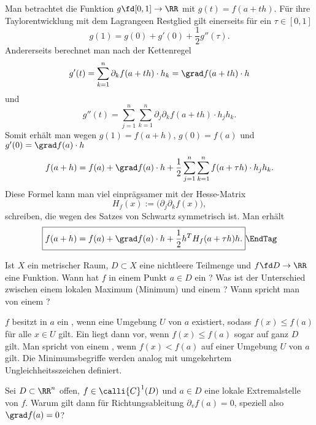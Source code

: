 \begin{antwort}
  Man betrachtet die Funktion $g\fd [0,1] \to\RR$ mit 
  $g(t)=f(a+th)$. Für ihre Taylorentwicklung mit dem Lagrange\sch en 
  Restglied gilt einerseits für ein $\tau \in [0,1]$ 
  \[
  g(1)=g(0)+g'(0)+\frac{1}{2} g''(\tau).
  \]
  Andererseits berechnet man nach der Kettenregel
  \[
  g'(t) = \sum_{k=1}^n \partial_k f(a+th) \cdot h_k = 
  \grad f(a+th)\cdot h 
  \]
  und 
  \[
  g''(t) = \sum_{j=1}^n\sum_{k=1}^n \partial_j \partial_k f(a+th)
  \cdot h_j h_k.  
  \]
  Somit erhält man wegen $g(1)=f(a+h)$, $g(0)=f(a)$ und 
  $g'(0)=\grad f(a)\cdot h$
  \[
  f(a+h)=f(a)+\grad f(a) \cdot h + \frac{1}{2} 
  \sum_{j=1}^n \sum_{k=1}^n f(a+\tau h)\cdot h_j h_k.
  \]
  Diese Formel kann man viel einprägsamer mit der  
  Hesse-Matrix 
  \[
  H_f (x ) := \big( \partial_j \partial_k f(x) \big),
  \]
  schreiben, die wegen des Satzes von Schwartz symmetrisch ist. Man erhält
  \begin{equation}
    \boxed{
      f(a+h)=f(a)+\grad f(a)\cdot h + \frac{1}{2} h^T H_f(a+\tau h) h.
    }
    \EndTag
  \end{equation}
\end{antwort}

\begin{frage}
  Ist $X$ ein metrischer Raum, $D\subset X$ eine nichtleere Teilmenge und 
  $f\fd D\to\RR$ eine Funktion. Wann hat $f$ in einem Punkt $a\in D$ ein 
  ? 
  Was ist der Unterschied zwischen einem lokalen Maximum (Mini\-mum) und 
  einem ?
  Wann spricht man von einem ?
\end{frage}

\begin{antwort}
  $f$ besitzt in $a$ ein , wenn eine Umgebung 
  $U$ von $a$ existiert, sodass $f(x) \le f(a)$ für alle $x\in U$ gilt. 
  Ein  liegt dann vor, wenn $f(x) \le f(a)$ sogar auf 
  ganz $D$ gilt. Man spricht von einem 
  , wenn $f(x)< f(a)$ auf einer Umgebung 
  $U$ von $a$ gilt. Die Minimumsbegriffe werden analog mit umgekehrtem 
  Ungleichheitsszeichen definiert. \AntEnd
\end{antwort}

\begin{frage}\label{10_fermat}
  Sei $D\subset\RR^n$ offen, $f\in \calli{C}^1(D)$ und $a\in D$ eine 
  lokale Extremalstelle von $f$. Warum gilt dann für  
  Richtungsableitung $\partial_v f(a)=0$, speziell also $\grad f(a)=0$?
\end{frage}

